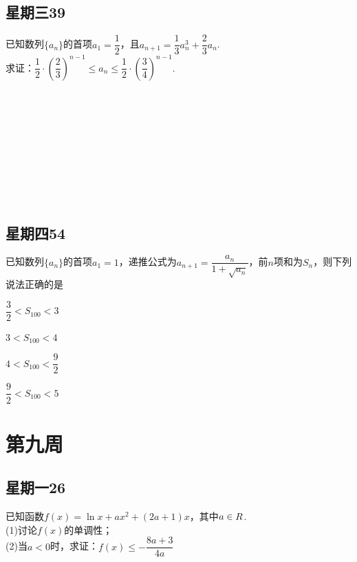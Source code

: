 \documentclass[UTF8,a4paper,11 pt]{ctexart}%
\let\mathbb\relax
\begin{document}
	\subsection{星期三39}\noindent
	已知数列$ \{a_n\} $的首项$ a_1=\dfrac{1}{2} $，且$ a_{n+1}=\dfrac{1}{3}a_n^3+\dfrac{2}{3}a_n $.
	\\求证：$ \dfrac{1}{2}\cdot\left(\dfrac{2}{3}\right)^{n-1}\le a_n\le\dfrac{1}{2}\cdot\left(\dfrac{3}{4}\right)^{n-1} $.
	\\\,\\\,\\\,\\\,\\\,\\\,\\\,\\\,\\\,
	\subsection{星期四54}\noindent
	已知数列$ \{a_n\} $的首项$ a_1=1 $，递推公式为$ a_{n+1}=\dfrac{a_n}{1+\sqrt{a_n}} $，前$ n $项和为$ S_n $，则下列说法正确的是\begin{xchoices}[label-style=Alph]
		\item $ \dfrac{3}{2}<S_{100}<3 $
		\item $ 3<S_{100}<4 $
		\item $ 4<S_{100}<\dfrac{9}{2} $
		\item $ \dfrac{9}{2}<S_{100}<5$
	\end{xchoices}
	\clearpage\section{第九周}
	\subsection{星期一26}\noindent
	已知函数$ f(x)=\ln x+ax^2+(2a+1)x $，其中$ a\in\mathbb{R} $.
	\\(1)讨论$ f(x) $的单调性；
	\\(2)当$ a<0 $时，求证：$ f(x)\le-\dfrac{8a+3}{4a} $
	\\\,\\\,\\\,\\\,\\\,\\\,\\\,\\\,\\\,\\\,\\\,\\\,
\end{document}
